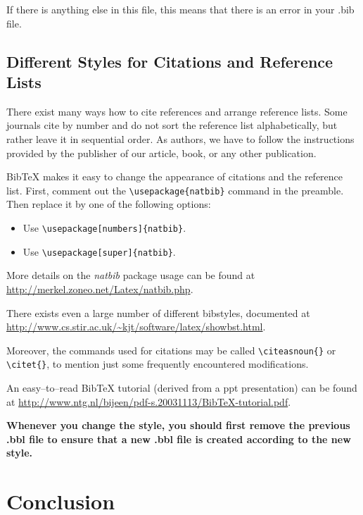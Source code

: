 \documentclass[12pt]{article}
\begin{document}
If there is anything else in this file, this means that there is an 
error in your .bib file.

\subsection{Different Styles for Citations and Reference Lists}

There exist many ways how to cite references and arrange reference lists.
Some journals cite by number and do not sort the reference list 
alphabetically, but rather leave it in sequential order. As authors,
we have to follow the instructions provided by the publisher
of our article, book, or any other publication.

BibTeX makes it easy to change the appearance of citations 
and the reference list. First, comment out the 
\verb|\usepackage{natbib}| command in the preamble.
Then replace it by one of the following options:

\begin{itemize}
\item Use \verb|\usepackage[numbers]{natbib}|.
\item Use \verb|\usepackage[super]{natbib}|.
\end{itemize}

More details on the {\it natbib} package usage can be found at
\url{http://merkel.zoneo.net/Latex/natbib.php}.

There exists even a large number of different bibstyles,
documented at 
\url{http://www.cs.stir.ac.uk/~kjt/software/latex/showbst.html}.

Moreover, the commands used for citations may be called
\verb|\citeasnoun{}| or \verb|\citet{}|, to mention just some
frequently encountered modifications.

An easy--to--read BibTeX tutorial (derived from a ppt presentation) 
can be found at 
\url{http://www.ntg.nl/bijeen/pdf-s.20031113/BibTeX-tutorial.pdf}.

{\bf Whenever you change the style, you should first
remove the previous .bbl file to ensure that a new .bbl file
is created according to the new style.}

\newpage


\section{Conclusion}
\end{document}
